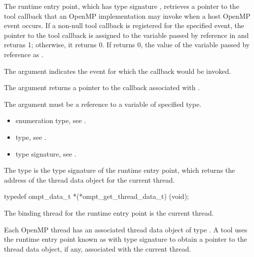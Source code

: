 \descr
The  runtime entry point, which has type signature 
, retrieves a pointer to the tool callback that
an OpenMP implementation may invoke when a host OpenMP event occurs. If a 
non-null tool callback is registered for the specified event, the pointer 
to the tool callback is assigned to the variable passed by reference in
 and  returns 1; otherwise, it returns 0. 
If  returns 0, the value of the variable passed by 
reference as .

\argdesc
The  argument indicates the event for which the callback would 
be invoked.

The  argument returns a pointer to the callback associated 
with .

\constraints
The  argument must be a reference to a variable of specified type.

\crossreferences
\begin{itemize}
\item {} enumeration type, see .

\item {} type, see .

\item {} type signature,
see .
\end{itemize}


\label{sec:ompt_get_thread_data_t}
\label{sec:ompt_get_thread_data}

\summary
The  type is the type signature of the 
 runtime entry point, which returns the
address of the thread data object for the current thread.

\format
\begin{ccppspecific}
\begin{omptInquiry}
typedef ompt_data_t *(*ompt_get_thread_data_t) (void);
\end{omptInquiry}
\end{ccppspecific}

\binding
The binding thread for the  runtime entry 
point is the current thread.

\descr
Each OpenMP thread has an associated thread data object of type
.
A tool uses the runtime entry point known as
with type signature 
to obtain a pointer to the thread data object, if any, associated with the
current thread. 

